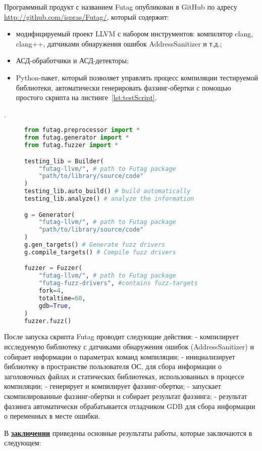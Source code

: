 Программный продукт с названием Futag опубликован в GitHub по адресу \url{http://github.com/ispras/Futag/}, который содержит:
\begin{itemize}
    \item модифицируемый проект LLVM с набором инструментов: компилятор clang, clang++, датчиками обнаружения ошибок AddressSanitizer и т.д.;
    \item АСД-обработчики и АСД-детекторы;
    \item Python-пакет, который позволяет управлять процесс компиляции тестируемой библиотеки, автоматически генерировать фаззинг-обертки с помощью простого скрипта на листинге~\cref{lst:testScript}.
\end{itemize}.
\begin{figure}[thp]
    \begin{lstlisting}[language=Python,frame=single,caption={Скрипт для запуска инструмент Futag},label=lst:testScript]
from futag.preprocessor import *
from futag.generator import *
from futag.fuzzer import *

testing_lib = Builder(
    "futag-llvm/", # path to Futag package
    "path/to/library/source/code" 
)
testing_lib.auto_build() # build automatically
testing_lib.analyze() # analyze the information

g = Generator(
    "futag-llvm/", # path to Futag package
    "path/to/library/source/code" 
)
g.gen_targets() # Generate fuzz drivers
g.compile_targets() # Compile fuzz drivers

fuzzer = Fuzzer(
    "futag-llvm/", # path to Futag package
    "futag-fuzz-drivers", #contains fuzz-targets
    fork=4,  
    totaltime=60,
    gdb=True,
)
fuzzer.fuzz()        
\end{lstlisting}
\end{figure}
После запуска скрипта Futag проводит следующие действия:
- компилирует исследуемую библиотеку с датчиками обнаружения ошибок (AddressSanitizer) и собирает информации о параметрах команд компиляции;
- инициализирует библиотеку в пространстве пользователя ОС, для сбора информации о заголовочных файлах и статических библиотеках, использованных в процессе компиляции;
- генерирует и компилирует фаззинг-обертки;
- запускает скомпилированные фаззинг-обертки и собирает результат фаззинга;
- результат фаззинга автоматически обрабатывается отладчиком GDB для сбора информации о переменных в месте ошибки.


\FloatBarrier
{}                                  %
В \underline{\textbf{заключении}} приведены основные результаты работы, которые заключаются в следующем:


